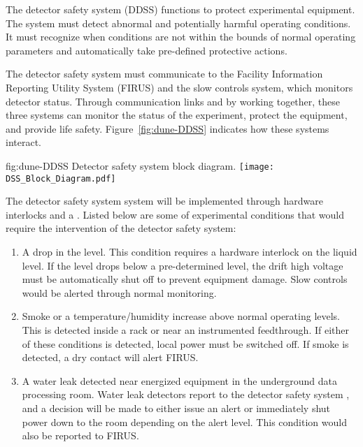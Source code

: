The  detector safety system (DDSS)  functions to protect
experimental equipment.  The system must detect abnormal and
potentially harmful operating conditions.  It must recognize when
conditions are not within the bounds of normal operating parameters
and automatically take pre-defined protective actions.


The detector safety system must communicate to the \surf Facility Information
Reporting Utility System (FIRUS)  and the  slow controls
system, which monitors detector status.  Through communication
links and by working together, these three systems can monitor the status of the experiment, protect the equipment,
and provide life safety. Figure~\ref{fig:dune-DDSS} indicates how
these systems interact.
\begin{dunefigure}{fig:dune-DDSS}
  {Detector safety system block diagram.}
  \texttt{[image: DSS\_Block\_Diagram.pdf]}
\end{dunefigure}


The detector safety system system will be implemented through hardware interlocks and a .  Listed below are some of  experimental conditions that would
require the intervention of the detector safety system:
\begin{enumerate}
 \item A drop in the  level.  This condition requires a hardware
   interlock on the liquid level.  If the level drops below a
   pre-determined level, the drift high voltage must be automatically 
   shut off to prevent equipment damage.  Slow controls would be
   alerted through normal monitoring.
 \item Smoke or a temperature/humidity increase above normal operating
   levels. This is detected inside a rack or near an instrumented
   feedthrough.  If either of these conditions is detected, local
   power must be switched off. If smoke is detected, a
   dry contact will alert FIRUS.
 \item A water leak detected near energized equipment in the 
   underground data processing room.  Water leak detectors 
   report to the detector safety system , and a decision will be made to either
   issue an alert or immediately shut power down to the room depending
   on the alert level.  This condition would also be reported
   to FIRUS.
\end{enumerate}
  
